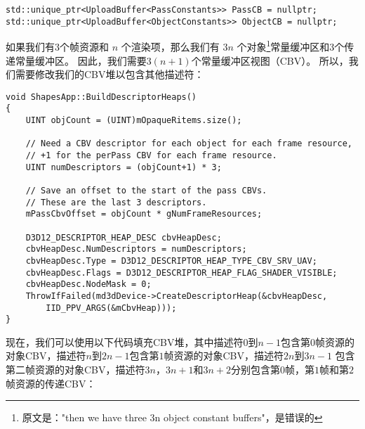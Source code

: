 \begin{lstlisting}
std::unique_ptr<UploadBuffer<PassConstants>> PassCB = nullptr;
std::unique_ptr<UploadBuffer<ObjectConstants>> ObjectCB = nullptr;
\end{lstlisting}

\begin{flushleft}
如果我们有3个帧资源和 $n$ 个渲染项，那么我们有 $3n$ 个对象\footnote{原文是："then we have three 3n object constant
buffers"，是错误的}常量缓冲区和3个传递常量缓冲区。 因此，我们需要$3(n+1)$个常量缓冲区视图（CBV）。 所以，我们需要修改我们的CBV堆以包含其他描述符：\\
\end{flushleft}

\begin{lstlisting}
void ShapesApp::BuildDescriptorHeaps()
{
    UINT objCount = (UINT)mOpaqueRitems.size();

    // Need a CBV descriptor for each object for each frame resource,
    // +1 for the perPass CBV for each frame resource.
    UINT numDescriptors = (objCount+1) * 3;

    // Save an offset to the start of the pass CBVs.  
    // These are the last 3 descriptors.
    mPassCbvOffset = objCount * gNumFrameResources;

    D3D12_DESCRIPTOR_HEAP_DESC cbvHeapDesc;
    cbvHeapDesc.NumDescriptors = numDescriptors;
    cbvHeapDesc.Type = D3D12_DESCRIPTOR_HEAP_TYPE_CBV_SRV_UAV;
    cbvHeapDesc.Flags = D3D12_DESCRIPTOR_HEAP_FLAG_SHADER_VISIBLE;
    cbvHeapDesc.NodeMask = 0;
    ThrowIfFailed(md3dDevice->CreateDescriptorHeap(&cbvHeapDesc,
        IID_PPV_ARGS(&mCbvHeap)));
}
\end{lstlisting}

\begin{flushleft}
现在，我们可以使用以下代码填充CBV堆，其中描述符$0$到$n-1$包含第$0$帧资源的对象CBV，描述符$n$到$2n-1$包含第$1$帧资源的对象CBV，描述符$2n$到$3n-1$ 包含第二帧资源的对象CBV，描述符$3n$，$3n + 1$和$3n + 2$分别包含第$0$帧，第$1$帧和第$2$帧资源的传递CBV：\\
\end{flushleft}

